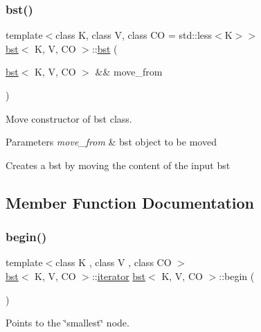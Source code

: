 \subsubsection{\texorpdfstring{bst()}{bst()}\hspace{0.1cm}{\footnotesize\ttfamily [4/4]}}
{\footnotesize\ttfamily template$<$class K, class V, class CO = std\+::less$<$\+K$>$$>$ \\
\hyperlink{classbst}{bst}$<$ K, V, CO $>$\+::\hyperlink{classbst}{bst} (\begin{DoxyParamCaption}\item[{\hyperlink{classbst}{bst}$<$ K, V, CO $>$ \&\&}]{move\+\_\+from }\end{DoxyParamCaption})\hspace{0.3cm}{\ttfamily [inline]}}



Move constructor of bst class. 


\begin{DoxyParams}{Parameters}
{\em move\+\_\+from} & bst object to be moved\\
\hline
\end{DoxyParams}
Creates a bst by moving the content of the input bst 

\subsection{Member Function Documentation}
\mbox{\label{classbst_a88986f214d0eb4f27a0aed7c0e43df8f}} 
\subsubsection{\texorpdfstring{begin()}{begin()}\hspace{0.1cm}{\footnotesize\ttfamily [1/2]}}
{\footnotesize\ttfamily template$<$class K , class V , class CO $>$ \\
\hyperlink{classbst}{bst}$<$ K, V, CO $>$\+::\hyperlink{classbst_a9378fa7f3f48ee62f3a0b4d168d8d98b}{iterator} \hyperlink{classbst}{bst}$<$ K, V, CO $>$\+::begin (\begin{DoxyParamCaption}{ }\end{DoxyParamCaption})\hspace{0.3cm}{\ttfamily [noexcept]}}



Points to the \char`\"{}smallest\char`\"{} node. 

